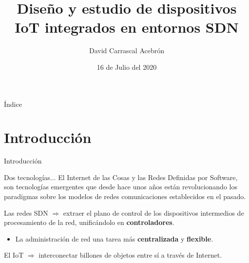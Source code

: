 \documentclass[10pt,compress,xcolor=table]{beamer} %
\title[Trabajo Fin de Grado]{Diseño y estudio de dispositivos IoT integrados en entornos SDN}
\author{David Carrascal Acebrón}
\institute{Departamento de Automática}
\date{16 de Julio del 2020}
\begin{document}
{\titlepageBlue
    \begin{frame}
        \titlepage
    \end{frame}
}

{
    \begin{frame}{Índice}
        \tableofcontents
    \end{frame}
}



\addtocounter{framenumber}{-1} %

\section{Introducción}
\begin{frame}{Introducción}
\begin{block}{Dos tecnologías...}
El Internet de las Cosas y las Redes Definidas por Software, son tecnologías emergentes que
desde hace unos años están revolucionando los paradigmas sobre los modelos de redes comunicaciones establecidos en el pasado.\vspace{0.2cm}
\end{block}
\vspace{0.2cm}
Las redes SDN $ \Rightarrow $ extraer el plano de control de los dispositivos intermedios de procesamiento de la red, unificándolo en \textbf{controladores}.\vspace{0.2cm} 
\begin{itemize}
    \item La administración de red una tarea más \textbf{centralizada} y \textbf{flexible}.
\end{itemize} \vspace{0.2cm}

El IoT  $ \Rightarrow $ interconectar billones de objetos entre sí a través de Internet. 
\end{frame}



\end{document}
